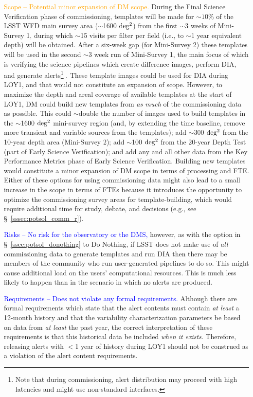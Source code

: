 \documentclass[DM,lsstdraft,toc]{lsstdoc}
\begin{document}
\textcolor{orange}{ Scope -- Potential minor expansion of DM scope.} During the Final Science Verification phase of commissioning, templates will be made for $\sim10\%$ of the LSST WFD main survey area ($\sim$1600 $\rm deg^2$) from the first $\sim$3 weeks of Mini-Survey 1, during which $\sim$15 visits per filter per field (i.e., to $\sim$1 year equivalent depth) will be obtained. After a six-week gap (for Mini-Survey 2) these templates will be used in the second $\sim$3 week run of Mini-Survey 1, the main focus of which is verifying the science pipelines which create difference images, perform DIA, and generate alerts\footnote{Note that during commissioning, alert distribution may proceed with high latencies and might use non-standard interfaces.} . These template images could be used for DIA during LOY1, and that would not constitute an expansion of scope. However, to maximize the depth and areal coverage of available templates at the start of LOY1, DM could build new templates from {\em as much} of the commissioning data as possible. This could $\sim$double the number of images used to build templates in the $\sim$1600 $\rm deg^2$ mini-survey region (and, by extending the time baseline, remove more transient and variable sources from the templates); add $\sim$300 $\rm deg^2$ from the 10-year depth area (Mini-Survey 2); add $\sim$100 $\rm deg^2$ from the 20-year Depth Test (part of Early Science Verification); and add any and all other data from the Key Performance Metrics phase of Early Science Verification. Building new templates would constitute a minor expansion of DM scope in terms of processing and FTE. Either of these options for using commissioning data might also lead to a small increase in the scope in terms of FTEs because it introduces the opportunity to optimize the commissioning survey areas for template-building, which would require additional time for study, debate, and decisions (e.g., see \S~\ref{sssec:potsol_comm_r}).

\textcolor{blue}{ Risks -- No risk for the observatory or the DMS,} however, as with the option in \S~\ref{ssec:potsol_donothing} to Do Nothing, if LSST does not make use of {\em all} commissioning data to generate templates and run DIA then there may be members of the community who run user-generated pipelines to do so. This might cause additional load on the users' computational resources. This is much less likely to happen than in the scenario in which no alerts are produced.

\textcolor{blue}{ Requirements -- Does not violate any formal requirements.} Although there are formal requirements which state that the alert contents must contain {\em at least} a 12-month history and that the variability characterization parameters be based on data from {\em at least} the past year, the correct interpretation of these requirements is that this historical data be included {\em when it exists}. Therefore, releasing alerts with $<$1 year of history during LOY1 should not be construed as a violation of the alert content requirements.
\end{document}
